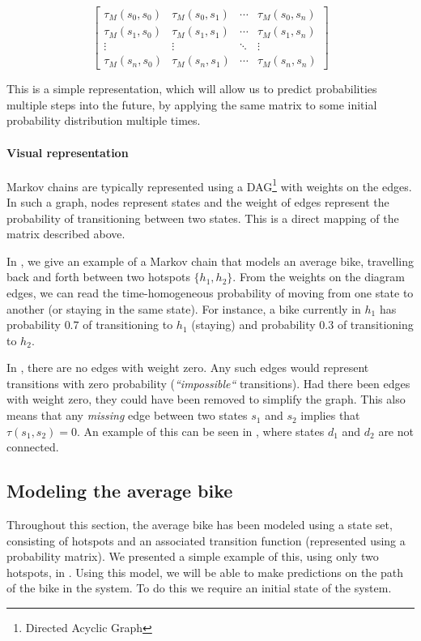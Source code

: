 \begin{equation}\label{markov:matrix}
\begin{bmatrix}
\tau_M(s_0, s_0) & \tau_M(s_0, s_1) & \cdots & \tau_M(s_0, s_n)\\
\tau_M(s_1, s_0) & \tau_M(s_1, s_1) & \cdots & \tau_M(s_1, s_n)\\
\vdots & \vdots & \ddots & \vdots\\
\tau_M(s_n, s_0) & \tau_M(s_n, s_1) & \cdots & \tau_M(s_n, s_n)
\end{bmatrix}
\end{equation}

This is a simple representation, which will allow us to predict probabilities multiple steps into the future, by applying the same matrix to some initial probability distribution multiple times.

\paragraph{Visual representation}
Markov chains are typically represented using a DAG\footnote{Directed Acyclic Graph} with weights on the edges.
In such a graph, nodes represent states and the weight of edges represent the probability of transitioning between two states.
This is a direct mapping of the matrix described above.

In , we give an example of a Markov chain that models an average bike, travelling back and forth between two hotspots $\{h_1, h_2\}$.
From the weights on the diagram edges, we can read the time-homogeneous probability of moving from one state to another (or staying in the same state).
For instance, a bike currently in $h_1$ has probability $0.7$ of transitioning to $h_1$ (staying) and probability $0.3$ of transitioning to $h_2$.



In , there are no edges with weight zero.
Any such edges would represent transitions with zero probability (\textit{``impossible``} transitions).
Had there been edges with weight zero, they could have been removed to simplify the graph.
This also means that any \textit{missing} edge between two states $s_1$ and $s_2$ implies that $\tau(s_1, s_2) = 0$.
An example of this can be seen in , where states $d_1$ and $d_2$ are not connected.

\subsection{Modeling the average bike}\label{markov:modeling}
Throughout this section, the average bike has been modeled using a state set, consisting of hotspots and an associated transition function (represented using a probability matrix).
We presented a simple example of this, using only two hotspots, in .
Using this model, we will be able to make predictions on the path of the bike in the system.
To do this we require an initial state of the system.

